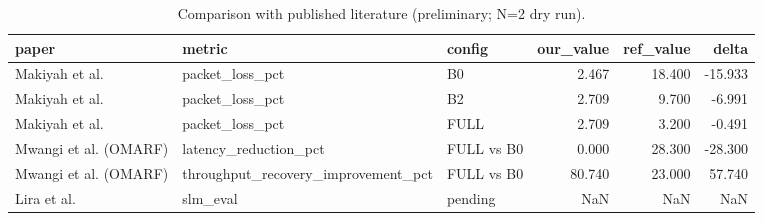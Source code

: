 \begin{table}
\caption{Comparison with published literature (preliminary; N=2 dry run).}
\label{tab:literature}
\begin{tabular}{lllrrr}
\toprule
paper & metric & config & our_value & ref_value & delta \\
\midrule
Makiyah et al. & packet_loss_pct & B0 & 2.467 & 18.400 & -15.933 \\
Makiyah et al. & packet_loss_pct & B2 & 2.709 & 9.700 & -6.991 \\
Makiyah et al. & packet_loss_pct & FULL & 2.709 & 3.200 & -0.491 \\
Mwangi et al. (OMARF) & latency_reduction_pct & FULL vs B0 & 0.000 & 28.300 & -28.300 \\
Mwangi et al. (OMARF) & throughput_recovery_improvement_pct & FULL vs B0 & 80.740 & 23.000 & 57.740 \\
Lira et al. & slm_eval & pending & NaN & NaN & NaN \\
\bottomrule
\end{tabular}
\end{table}
